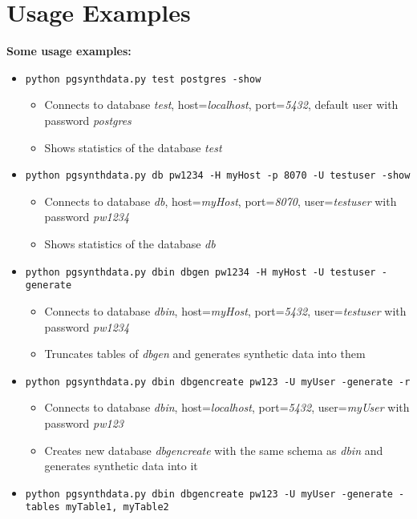 \section{Usage Examples}
\textbf{Some usage examples:}
\begin{itemize}
	\item \texttt{python pgsynthdata.py test postgres -show}
	\begin{itemize}
		\item Connects to database \textit{test}, host=\textit{localhost}, port=\textit{5432}, default user with password \textit{postgres}
		\item Shows statistics of the database \textit{test}
	\end{itemize}
	\item \texttt{python pgsynthdata.py db pw1234 -H myHost -p 8070 -U testuser -show}
	\begin{itemize}
		\item Connects to database \textit{db}, host=\textit{myHost}, port=\textit{8070}, user=\textit{testuser} with password \textit{pw1234}
		\item Shows statistics of the database \textit{db}
	\end{itemize}
	\item \texttt{python pgsynthdata.py dbin dbgen pw1234 -H myHost -U testuser -generate}
	\begin{itemize}
		\item Connects to database \textit{dbin}, host=\textit{myHost}, port=\textit{5432}, user=\textit{testuser} with password \textit{pw1234}
		\item Truncates tables of \textit{dbgen} and generates synthetic data into them
	\end{itemize}
	\item \texttt{python pgsynthdata.py dbin dbgencreate pw123 -U myUser -generate -r}
	\begin{itemize}
		\item Connects to database \textit{dbin}, host=\textit{localhost}, port=\textit{5432}, user=\textit{myUser} with password \textit{pw123}
		\item Creates new database \textit{dbgencreate} with the same schema as \textit{dbin} and generates synthetic data into it
	\end{itemize}
	\item \texttt{python pgsynthdata.py dbin dbgencreate pw123 -U myUser -generate -tables myTable1, myTable2}
	\begin{itemize}

\end{itemize}
\end{itemize}
